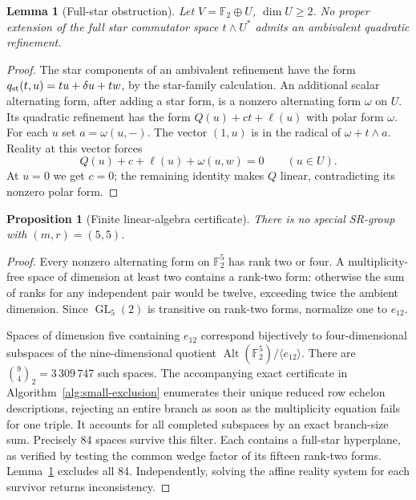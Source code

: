 \documentclass[11pt,a4paper]{amsart}
\newtheorem{lemma}[thm]{Lemma}
\newtheorem{prop}[thm]{Proposition}
\theoremstyle{definition}
\theoremstyle{remark}
\newcommand{\F}{\mathbb F}
\DeclareMathOperator{\GL}{GL}
\DeclareMathOperator{\Alt}{Alt}
\numberwithin{equation}{section}
\begin{document}
\begin{lemma}[Full-star obstruction]\label{lem:star-extension}
Let $V=\F_2\oplus U$, $\dim U\ge2$. No proper extension of the full
star commutator space $t\wedge U^*$ admits an ambivalent quadratic
refinement.
\end{lemma}
\begin{proof}
The star components of an ambivalent refinement have the form
$q_{\rm st}(t,u)=tu+\delta u+tw$, by the star-family calculation.
An additional scalar alternating form, after adding a star form, is
a nonzero alternating form $\omega$ on $U$. Its quadratic refinement
has the form $Q(u)+ct+\ell(u)$ with polar form $\omega$.
For each $u$ set $a=\omega(u,-)$. The vector $(1,u)$ is in the radical
of $\omega+t\wedge a$. Reality at this vector forces
\[
 Q(u)+c+\ell(u)+\omega(u,w)=0\qquad(u\in U).
\]
At $u=0$ we get $c=0$; the remaining identity makes $Q$ linear,
contradicting its nonzero polar form.
\end{proof}

\begin{prop}[Finite linear-algebra certificate]\label{prop:55-exclusion}
There is no special SR-group with $(m,r)=(5,5)$.
\end{prop}
\begin{proof}
Every nonzero alternating form on $\F_2^5$ has rank two or four.
A multiplicity-free space of dimension at least two contains a
rank-two form: otherwise the sum of ranks for any independent pair
would be twelve, exceeding twice the ambient dimension. Since
$\GL_5(2)$ is transitive on rank-two forms, normalize one to $e_{12}$.

Spaces of dimension five containing $e_{12}$ correspond bijectively
to four-dimensional subspaces of the nine-dimensional quotient
$\Alt(\F_2^5)/\langle e_{12}\rangle$. There are
$\binom94_2=3\,309\,747$ such spaces. The accompanying exact
certificate in Algorithm~\ref{alg:small-exclusion} enumerates their unique reduced
row echelon descriptions, rejecting an entire branch as soon as the
multiplicity equation fails for one triple. It accounts for all
completed subspaces by an exact branch-size sum. Precisely 84 spaces
survive this filter. Each contains a full-star hyperplane, as verified
by testing the common wedge factor of its fifteen rank-two forms.
Lemma~\ref{lem:star-extension} excludes all 84. Independently, solving
the affine reality system for each survivor returns inconsistency.
\end{proof}
\end{document}
